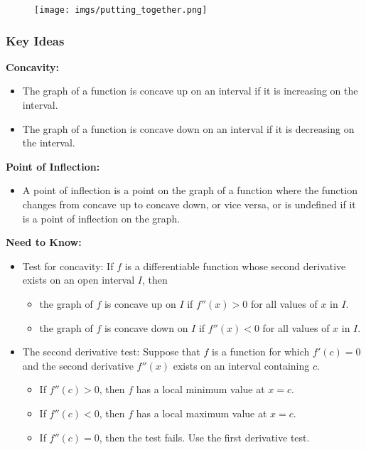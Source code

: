 \documentclass{article}
\begin{document}
\begin{figure}[h]
    \centering
    \texttt{[image: imgs/putting\_together.png]}
\end{figure}
\subsubsection{Key Ideas}
\textbf{Concavity:}
\begin{itemize}
    \item The graph of a function is concave up on an interval if it is increasing on the interval.
    \item The graph of a function is concave down on an interval if it is decreasing on the interval.
\end{itemize}

\textbf{Point of Inflection:}
\begin{itemize}
    \item A point of inflection is a point on the graph of a function where the function changes from concave up to concave down, or vice versa, or is undefined if it is a point of inflection on the graph.
\end{itemize}

\textbf{Need to Know:}
\begin{itemize}
    \item Test for concavity: If $f$ is a differentiable function whose second derivative exists on an open interval $I$, then
    \begin{itemize}
        \item the graph of $f$ is concave up on $I$ if $f''(x) > 0$ for all values of $x$ in $I$.
        \item the graph of $f$ is concave down on $I$ if $f''(x) < 0$ for all values of $x$ in $I$.
    \end{itemize}
    \item The second derivative test: Suppose that $f$ is a function for which $f'(c) = 0$ and the second derivative $f''(x)$ exists on an interval containing $c$.
    \begin{itemize}
        \item If $f''(c) > 0$, then $f$ has a local minimum value at $x = c$.
        \item If $f''(c) < 0$, then $f$ has a local maximum value at $x = c$.
        \item If $f''(c) = 0$, then the test fails. Use the first derivative test.
    \end{itemize}
\end{itemize}
\newpage
\end{document}
